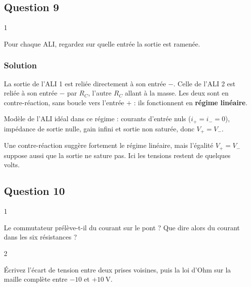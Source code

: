 \documentclass[11pt,a4paper]{article}
\begin{document}
\hypertarget{question-9}{%
\subsection{Question 9}\label{question-9}}

\begin{indication}{1}

Pour chaque ALI, regardez sur quelle entrée la sortie est ramenée.

\end{indication}

\hypertarget{solution-8}{%
\subsubsection{Solution}\label{solution-8}}

La sortie de l'ALI 1 est reliée directement à son entrée \(-\). Celle de l'ALI 2 est reliée à son entrée \(-\) par \(R_C\), l'autre \(R_C\) allant à la masse. Les deux sont en contre-réaction, sans boucle vers l'entrée \(+\) : ils fonctionnent en \textbf{régime linéaire}.

Modèle de l'ALI idéal dans ce régime : courants d'entrée nuls (\(i_+=i_-=0\)), impédance de sortie nulle, gain infini et sortie non saturée, donc \(\boxed{V_+=V_-}\).

\begin{piege}

Une contre-réaction suggère fortement le régime linéaire, mais l'égalité \(V_+=V_-\) suppose aussi que la sortie ne sature pas. Ici les tensions restent de quelques volts.

\end{piege}

\hypertarget{question-10}{%
\subsection{Question 10}\label{question-10}}

\begin{indication}{1}

Le commutateur prélève-t-il du courant sur le pont ? Que dire alors du courant dans les six résistances ?

\end{indication}

\begin{indication}{2}

Écrivez l'écart de tension entre deux prises voisines, puis la loi d'Ohm sur la maille complète entre \(-10\) et \(+10\ \mathrm{V}\).

\end{indication}
\end{document}
